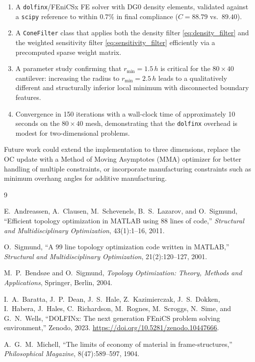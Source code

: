 \documentclass[11pt,a4paper]{article}
\begin{document}
\begin{enumerate}
  \item A \texttt{dolfinx}/FEniCSx FE solver with DG0 density elements,
        validated against a \texttt{scipy} reference to within $0.7\%$ in
        final compliance ($C = 88.79$ vs.\ $89.40$).

  \item A \texttt{ConeFilter} class that applies both the density filter
        \cref{eq:density_filter} and the weighted sensitivity filter
        \cref{eq:sensitivity_filter} efficiently via a precomputed sparse
        weight matrix.

  \item A parameter study confirming that $r_\mathrm{min} = 1.5\,h$ is
        critical for the $80 \times 40$ cantilever: increasing the radius
        to $r_\mathrm{min} = 2.5\,h$ leads to a qualitatively different
        and structurally inferior local minimum with disconnected boundary
        features.

  \item Convergence in 150 iterations with a wall-clock time of
        approximately 10 seconds on the $80 \times 40$ mesh, demonstrating
        that the \texttt{dolfinx} overhead is modest for two-dimensional
        problems.
\end{enumerate}

Future work could extend the implementation to three dimensions, replace
the OC update with a Method of Moving Asymptotes (MMA) optimizer for
better handling of multiple constraints, or incorporate manufacturing
constraints such as minimum overhang angles for additive manufacturing.

\begin{thebibliography}{9}

E.~Andreassen, A.~Clausen, M.~Schevenels, B.~S.~Lazarov, and O.~Sigmund,
\newblock ``Efficient topology optimization in \textsc{MATLAB} using 88 lines of code,''
\newblock \textit{Structural and Multidisciplinary Optimization}, 43(1):1--16, 2011.

O.~Sigmund,
\newblock ``A 99 line topology optimization code written in \textsc{MATLAB},''
\newblock \textit{Structural and Multidisciplinary Optimization}, 21(2):120--127, 2001.

M.~P.~Bends\o{}e and O.~Sigmund,
\newblock \textit{Topology Optimization: Theory, Methods and Applications},
\newblock Springer, Berlin, 2004.

I.~A.~Baratta, J.~P.~Dean, J.~S.~Hale, Z.~Kazimierczak, J.~S.~Dokken,
  I.~Habera, J.~Hales, C.~Richardson, M.~Rognes, M.~Scroggs, N.~Sime, and
  G.~N.~Wells,
\newblock ``DOLFINx: The next generation FEniCS problem solving environment,''
\newblock Zenodo, 2023. \url{https://doi.org/10.5281/zenodo.10447666}.

A.~G.~M.~Michell,
\newblock ``The limits of economy of material in frame-structures,''
\newblock \textit{Philosophical Magazine}, 8(47):589--597, 1904.

\end{thebibliography}
\end{document}
